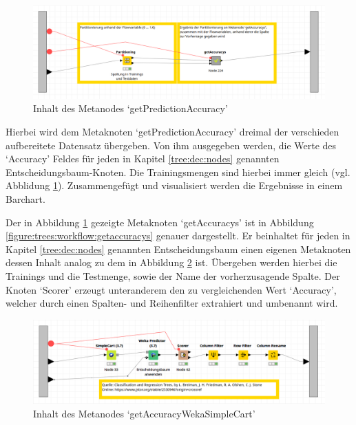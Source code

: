 \documentclass[12pt,					%
							 oneside,			%
							 a4paper,			%
							 halfparskip,		%
							 liststotoc,			%
							 bibtotoc,			%
							 fleqn,				%
							 pointlessnumbers]	%
							 {scrreprt}
\begin{document}
		\begin{figure}[h]
			\begin{center}
				\includegraphics[scale=0.35]{pictures/trees-workflow-partitioning.png}
				\caption{Inhalt des Metanodes `getPredictionAccuracy'}									
				\label{figure:trees:workflow:partitioning}
			\end{center}
		\end{figure}
		
		Hierbei wird dem Metaknoten `getPredictionAccuracy' dreimal der verschieden aufbereitete Datensatz übergeben. Von ihm ausgegeben werden, die Werte des `Accuracy' Feldes für jeden in Kapitel \ref{tree:dec:nodes} genannten Entscheidungsbaum-Knoten. Die Trainingsmengen sind hierbei immer gleich (vgl. Abblidung \ref{figure:trees:workflow:partitioning}). Zusammengefügt und visualisiert werden die Ergebnisse in einem Barchart.
		
		Der in Abbildung \ref{figure:trees:workflow:partitioning}	 gezeigte Metaknoten `getAccuracys' ist in Abbildung \ref{figure:trees:workflow:getaccuracys} genauer dargestellt. Er beinhaltet für jeden in Kapitel \ref{tree:dec:nodes} genannten Entscheidungsbaum einen eigenen Metaknoten dessen Inhalt analog zu dem in Abbildung \ref{figure:trees:workflow:example:weka} ist. Übergeben werden hierbei die Trainings und die Testmenge, sowie der Name der vorherzusagende Spalte. Der Knoten `Scorer' erzeugt unteranderem den zu vergleichenden Wert `Accuracy', welcher durch einen Spalten- und Reihenfilter extrahiert und umbenannt wird.
		
		\begin{figure}[h]
			\begin{center}
				\includegraphics[scale=0.35]{pictures/trees-workflow-weka-example.png}
				\caption{Inhalt des Metanodes `getAccuracyWekaSimpleCart'}									
				\label{figure:trees:workflow:example:weka}
			\end{center}
		\end{figure}
		
\end{document}
